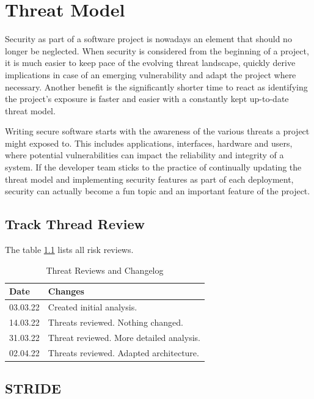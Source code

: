 \chapter{Threat Model}

Security as part of a software project is nowadays an element that should no longer be neglected. When security is considered from the beginning of a project, it is much easier to keep pace of the evolving threat landscape, quickly derive implications in case of an emerging vulnerability and adapt the project where necessary. Another benefit is the significantly shorter time to react as identifying the project's exposure is faster and easier with a constantly kept up-to-date threat model.

Writing secure software starts with the awareness of the various threats a project might exposed to. This includes applications, interfaces, hardware and users, where potential vulnerabilities can impact the reliability and integrity of a system. If the developer team sticks to the practice of continually updating the threat model and implementing security features as part of each deployment, security can actually become a fun topic and an important feature of the project.

\section{Track Thread Review}
The table \ref{tab:threat-review} lists all risk reviews.

\begin{table}[h!]
  \centering
  \caption{\label{tab:threat-review}Threat Reviews and Changelog}
  \begin{tabular}{ | l | l | }
    \hline
    \textbf{Date} & \textbf{Changes} \\
    \hline
    03.03.22 & Created initial analysis. \\
    \hline
    14.03.22 & Threats reviewed. Nothing changed. \\
    \hline
    31.03.22 & Threat reviewed. More detailed analysis. \\
    \hline
    02.04.22 & Threats reviewed. Adapted architecture.\\
    \hline
  \end{tabular}
\end{table}

\section{STRIDE}

